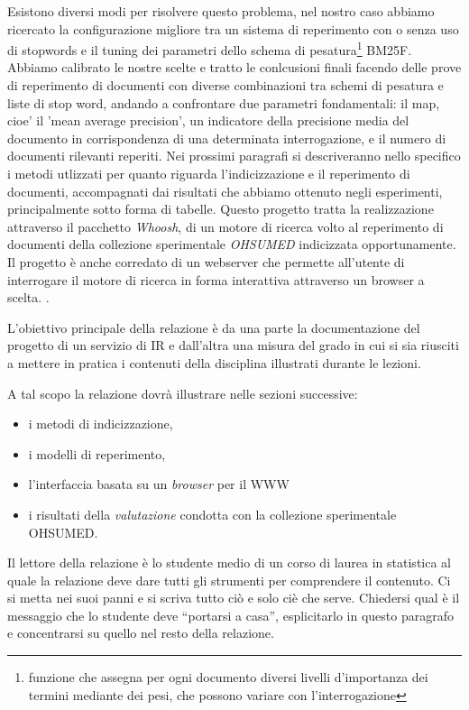 \documentclass[runningheads]{llncs}
\begin{document}
Esistono diversi modi per risolvere questo problema, nel nostro caso abbiamo ricercato la configurazione migliore tra un sistema di
reperimento con o senza uso di stopwords e il tuning dei parametri dello schema di pesatura\footnote{funzione che assegna per ogni documento diversi livelli d’importanza dei termini mediante dei pesi, che possono variare con l’interrogazione} BM25F.
Abbiamo calibrato le nostre scelte e tratto le conlcusioni finali facendo delle prove di reperimento di documenti con diverse combinazioni tra schemi di pesatura e liste di stop word, andando a confrontare due parametri fondamentali: il map, cioe' il 'mean average precision', un indicatore della precisione media del documento in corrispondenza di una determinata interrogazione, e il numero di documenti rilevanti reperiti.
Nei prossimi paragrafi si descriveranno nello specifico i metodi utlizzati per quanto riguarda l'indicizzazione e il reperimento di documenti, accompagnati dai risultati che abbiamo ottenuto negli esperimenti, principalmente sotto forma di tabelle.
Questo progetto tratta la realizzazione attraverso il pacchetto \emph{Whoosh}, di un motore di ricerca
volto al reperimento di documenti della collezione sperimentale \emph{OHSUMED} indicizzata opportunamente.
Il progetto è anche corredato di un webserver che permette all'utente di interrogare il motore di ricerca
in forma interattiva attraverso un browser a scelta.
\cite{WBC}.




L'obiettivo principale della relazione \`e da una parte la
documentazione del progetto di un servizio di {IR} e dall'altra una
misura del grado in cui si sia riusciti a mettere in pratica i
contenuti della disciplina illustrati durante le lezioni.

A tal scopo la relazione dovr\`a illustrare nelle sezioni successive:
\begin{itemize}
\item i metodi di indicizzazione,
\item i modelli di reperimento,
\item l'interfaccia basata su un \textit{browser} per il {WWW}
\item i risultati della \emph{valutazione} condotta con la collezione
  sperimentale OHSUMED.
\end{itemize}
Il lettore della relazione \`e lo studente medio di un corso di laurea
in statistica al quale la relazione deve dare tutti gli strumenti per
comprendere il contenuto.  Ci si metta nei suoi panni e si scriva
tutto ci\`o e solo ci\`e che serve.  Chiedersi qual \`e il messaggio
che lo studente deve ``portarsi a casa'', esplicitarlo in questo
paragrafo e concentrarsi su quello nel resto della relazione.
\end{document}
